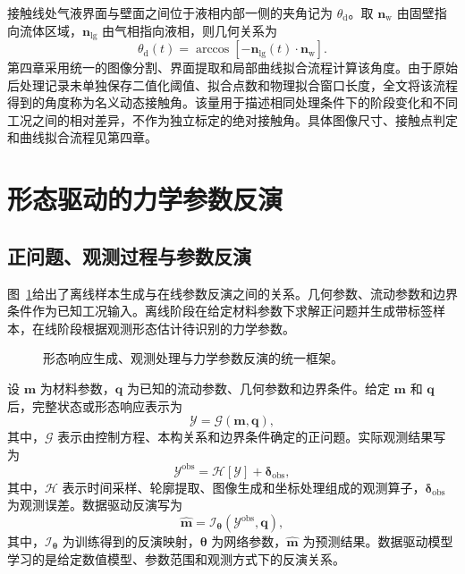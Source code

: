 接触线处气液界面与壁面之间位于液相内部一侧的夹角记为 $\theta_{\mathrm d}$。取 $\boldsymbol{n}_{\mathrm w}$ 由固壁指向流体区域，$\boldsymbol{n}_{\mathrm{lg}}$ 由气相指向液相，则几何关系为
\begin{equation}
\theta_{\mathrm d}(t)
=
\arccos
\left[
-\boldsymbol{n}_{\mathrm{lg}}(t)
\cdot
\boldsymbol{n}_{\mathrm w}
\right].
\label{eq:ch2_dynamic_contact_angle}
\end{equation}
第四章采用统一的图像分割、界面提取和局部曲线拟合流程计算该角度。由于原始后处理记录未单独保存二值化阈值、拟合点数和物理拟合窗口长度，全文将该流程得到的角度称为名义动态接触角。该量用于描述相同处理条件下的阶段变化和不同工况之间的相对差异，不作为独立标定的绝对接触角。具体图像尺寸、接触点判定和曲线拟合流程见第四章。

\section{形态驱动的力学参数反演}

\subsection{正问题、观测过程与参数反演}

图~\ref{fig:ch2_inverse_framework}给出了离线样本生成与在线参数反演之间的关系。几何参数、流动参数和边界条件作为已知工况输入。离线阶段在给定材料参数下求解正问题并生成带标签样本，在线阶段根据观测形态估计待识别的力学参数。

\begin{figure}[htbp]
  \centering
  
  \caption{形态响应生成、观测处理与力学参数反演的统一框架。}
  \label{fig:ch2_inverse_framework}
\end{figure}

设 $\boldsymbol{m}$ 为材料参数，$\boldsymbol{q}$ 为已知的流动参数、几何参数和边界条件。给定 $\boldsymbol{m}$ 和 $\boldsymbol{q}$ 后，完整状态或形态响应表示为
\begin{equation}
\mathcal{Y}
=
\mathcal{G}(\boldsymbol{m},\boldsymbol{q}),
\label{eq:ch2_forward_problem}
\end{equation}
其中，$\mathcal{G}$ 表示由控制方程、本构关系和边界条件确定的正问题。实际观测结果写为
\begin{equation}
\mathcal{Y}^{\mathrm{obs}}
=
\mathcal{H}\!\left[\mathcal{Y}\right]
+
\boldsymbol{\delta}_{\mathrm{obs}},
\label{eq:ch2_observation_model}
\end{equation}
其中，$\mathcal{H}$ 表示时间采样、轮廓提取、图像生成和坐标处理组成的观测算子，$\boldsymbol{\delta}_{\mathrm{obs}}$ 为观测误差。数据驱动反演写为
\begin{equation}
\widehat{\boldsymbol{m}}
=
\mathcal{I}_{\boldsymbol{\theta}}
\left(
\mathcal{Y}^{\mathrm{obs}},
\boldsymbol{q}
\right),
\label{eq:ch2_inverse_problem}
\end{equation}
其中，$\mathcal{I}_{\boldsymbol{\theta}}$ 为训练得到的反演映射，$\boldsymbol{\theta}$ 为网络参数，$\widehat{\boldsymbol{m}}$ 为预测结果。数据驱动模型学习的是给定数值模型、参数范围和观测方式下的反演关系。

